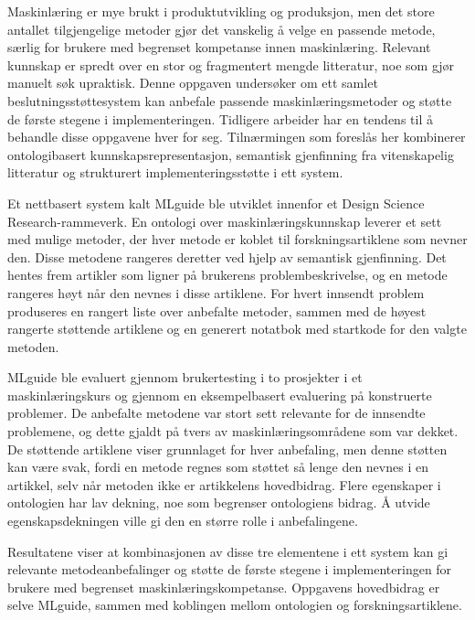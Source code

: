 Maskinlæring er mye brukt i produktutvikling og produksjon,
men det store antallet tilgjengelige metoder gjør det vanskelig å velge en passende metode,
særlig for brukere med begrenset kompetanse innen maskinlæring.
Relevant kunnskap er spredt over en stor og fragmentert mengde litteratur,
noe som gjør manuelt søk upraktisk.
Denne oppgaven undersøker om ett samlet beslutningsstøttesystem kan anbefale
passende maskinlæringsmetoder og støtte de første stegene i implementeringen.
Tidligere arbeider har en tendens til å behandle disse oppgavene hver for seg.
Tilnærmingen som foreslås her kombinerer ontologibasert kunnskapsrepresentasjon,
semantisk gjenfinning fra vitenskapelig litteratur
og strukturert implementeringsstøtte i ett system.

Et nettbasert system kalt MLguide ble utviklet
innenfor et Design Science Research-rammeverk.
En ontologi over maskinlæringskunnskap leverer et sett med mulige metoder,
der hver metode er koblet til forskningsartiklene som nevner den.
Disse metodene rangeres deretter ved hjelp av semantisk gjenfinning.
Det hentes frem artikler som ligner på brukerens problembeskrivelse,
og en metode rangeres høyt når den nevnes i disse artiklene.
For hvert innsendt problem produseres en rangert liste over anbefalte metoder,
sammen med de høyest rangerte støttende artiklene
og en generert notatbok med startkode for den valgte metoden.

MLguide ble evaluert gjennom brukertesting i to prosjekter i et maskinlæringskurs
og gjennom en eksempelbasert evaluering på konstruerte problemer.
De anbefalte metodene var stort sett relevante for de innsendte problemene,
og dette gjaldt på tvers av maskinlæringsområdene som var dekket.
De støttende artiklene viser grunnlaget for hver anbefaling,
men denne støtten kan være svak,
fordi en metode regnes som støttet så lenge den nevnes i en artikkel,
selv når metoden ikke er artikkelens hovedbidrag.
Flere egenskaper i ontologien har lav dekning,
noe som begrenser ontologiens bidrag.
Å utvide egenskapsdekningen ville gi den en større rolle i anbefalingene.

Resultatene viser at kombinasjonen av disse tre elementene i ett system
kan gi relevante metodeanbefalinger
og støtte de første stegene i implementeringen
for brukere med begrenset maskinlæringskompetanse.
Oppgavens hovedbidrag er selve MLguide,
sammen med koblingen mellom ontologien og forskningsartiklene.